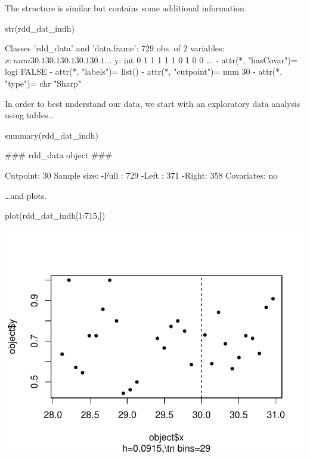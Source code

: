 \documentclass[article]{jss}
\begin{document}
The structure is similar but contains some additional information.

\begin{CodeChunk}
\begin{CodeInput}
str(rdd_dat_indh)
\end{CodeInput}
\begin{CodeOutput}
Classes 'rdd_data' and 'data.frame':    729 obs. of  2 variables:
 $ x: num  30.1 30.1 30.1 30.1 30.1 ...
 $ y: int  0 1 1 1 1 1 0 1 0 0 ...
 - attr(*, "hasCovar")= logi FALSE
 - attr(*, "labels")= list()
 - attr(*, "cutpoint")= num 30
 - attr(*, "type")= chr "Sharp"
\end{CodeOutput}
\end{CodeChunk}

In order to best understand our data, we start with an exploratory data
analysis using tables\ldots{}

\begin{CodeChunk}
\begin{CodeInput}
summary(rdd_dat_indh)
\end{CodeInput}
\begin{CodeOutput}
### rdd_data object ###

Cutpoint: 30 
Sample size: 
    -Full : 729 
    -Left : 371 
    -Right: 358
Covariates: no 
\end{CodeOutput}
\end{CodeChunk}

\ldots{}and plots.

\begin{CodeChunk}
\begin{CodeInput}
plot(rdd_dat_indh[1:715,])
\end{CodeInput}


\begin{center}\includegraphics{README_files/figure-latex/unnamed-chunk-7-1} \end{center}

\end{CodeChunk}
\end{document}
